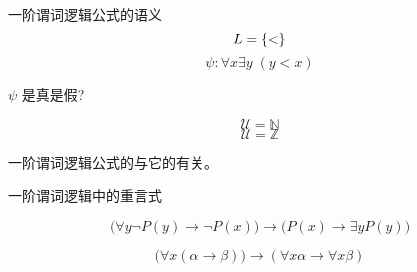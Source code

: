 \begin{frame}{}
  \begin{exampleblock}{一阶谓词逻辑公式的语义}
    \[
      L = \{<\}
    \]
    \[
      \psi: \forall x \exists y \; (y < x)
    \]

    \pause
    \begin{center}
      { $\psi$ 是真是假?}
    \end{center}
  \end{exampleblock}

  \pause
  \[
    \mathcal{U} = \mathbb{N}
  \]
  \pause
  \[
    \mathcal{U} = \mathbb{Z}
  \]

  \pause
  \begin{center}
    一阶谓词逻辑公式的与它的有关。\\[20pt]

    \pause
  \end{center}
\end{frame}

\begin{frame}{}
  \begin{center}
    一阶谓词逻辑中的重言式
  \end{center}

  \[
    \Big(\forall y \lnot P(y) \to \lnot P(x)\Big) \to \Big(P(x) \to \exists y P(y)\Big)
  \]

  \[
    \Big(\forall x (\alpha \to \beta)\Big) \to (\forall x \alpha \to \forall x \beta)
  \]
\end{frame}
